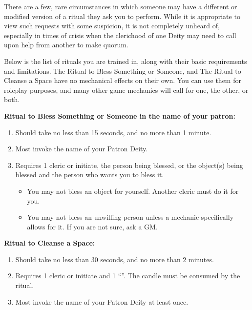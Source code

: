 \documentclass[green]{GL2020}
\begin{document}
There are a few, rare circumstances in which someone may have a different or modified version of a ritual they ask you to perform. While it is appropriate to view such requests with some suspicion, it is not completely unheard of, especially in times of crisis when the clerichood of one Deity may need to call upon help from another to make quorum.

Below is the list of rituals you are trained in, along with their basic requirements and limitations. The Ritual to Bless Something or Someone, and The Ritual to Cleanse a Space have no mechanical effects on their own. You can use them for roleplay purposes, and many other game mechanics will call for one, the other, or both.

\textbf{Ritual to Bless Something or Someone in the name of your patron:}
  \begin{enumerate}
    \item Should take no less than 15 seconds, and no more than 1 minute.
    \item Most invoke the name of your Patron Deity.
    \item Requires 1 cleric or initiate, the person being blessed, or the object(s) being blessed and the person who wants you to bless it. 
    \begin{itemize}
      \item You may not bless an object for yourself. Another cleric must do it for you.
      \item You may not bless an unwilling person unless a mechanic specifically allows for it. If you are not sure, ask a GM.
    \end{itemize}
  \end{enumerate}

\textbf{Ritual to Cleanse a Space:}
  \begin{enumerate}
    \item Should take no less than 30 seconds, and no more than 2 minutes.
    \item Requires 1 cleric or initiate and 1 ``\iRitualCandle{}''. The candle must be consumed by the ritual.
    \item Most invoke the name of your Patron Deity at least once.
  \end{enumerate}
   
\end{document}

